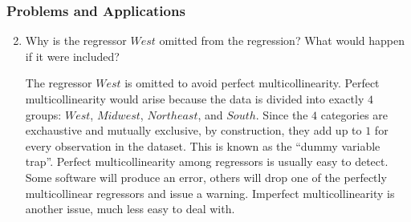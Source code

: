 \begin{frame}
\frametitle{Problems and Applications}

\begin{enumerate}\setcounter{enumi}{1}

\item Why is the regressor $West$ omitted from the regression? What would happen if it were included?

\begin{answer}
The regressor $West$ is omitted to avoid perfect multicollinearity. Perfect multicollinearity would arise because the data is divided into exactly $4$ groups: $West$, $Midwest$, $Northeast$, and $South$. Since the $4$ categories are exchaustive and mutually exclusive, by construction, they add up to $1$ for every observation in the dataset. This is known as the ``dummy variable trap''. Perfect multicollinearity among regressors is usually easy to detect. Some software will produce an error, others will drop one of the perfectly multicollinear regressors and issue a warning. Imperfect multicollinearity is another issue, much less easy to deal with. 
\end{answer}

\end{enumerate}
\end{frame}


